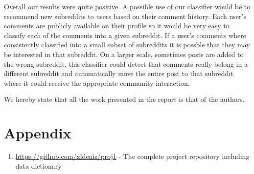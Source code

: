 \documentclass[10pt,twocolumn]{article}
\begin{document}
Overall our results were quite positive. A possible use of our classifier would be to recommend new subreddits to users based on their comment history. Each user's comments are publicly available on their profile so it would be very easy to classify each of the comments into a given subreddit. If a user's comments where consistently classified into a small subset of subreddits it is possble that they may be interested in that subreddit. On a larger scale, sometimes posts are added to the wrong subreddit, this classifier could detect that comments really belong in a different subreddit and automatically move the entire post to that subreddit where it could receive the appropriate community interaction.

We hereby state that all the work presented in the report is that of the authors.

\printbibliography
\section{Appendix}
\begin {enumerate}
\item \url{https://github.com/xldenis/proj1} - The complete project repository including data dictionary
\end{enumerate}
\end{document}
